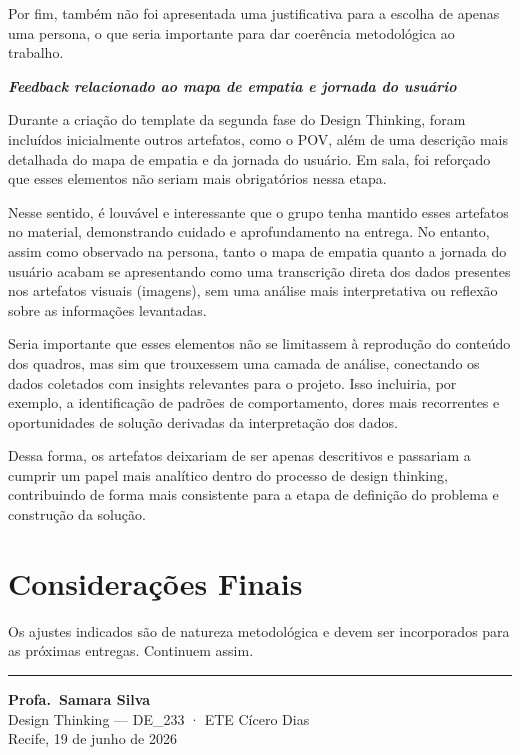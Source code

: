 \documentclass[
  sigconf,
  nonacm, %
  language=portuguese
]{acmart}
\begin{document}
Por fim, também não foi apresentada uma justificativa para a escolha de apenas uma persona, o que seria importante para dar coerência metodológica ao trabalho.

\textit{\textbf{Feedback relacionado ao mapa de empatia e jornada do usuário}}

Durante a criação do template da segunda fase do Design Thinking, foram incluídos inicialmente outros artefatos, como o POV, além de uma descrição mais detalhada do mapa de empatia e da jornada do usuário. Em sala, foi reforçado que esses elementos não seriam mais obrigatórios nessa etapa.

Nesse sentido, é louvável e interessante que o grupo tenha mantido esses artefatos no material, demonstrando cuidado e aprofundamento na entrega. No entanto, assim como observado na persona, tanto o mapa de empatia quanto a jornada do usuário acabam se apresentando como uma transcrição direta dos dados presentes nos artefatos visuais (imagens), sem uma análise mais interpretativa ou reflexão sobre as informações levantadas.

Seria importante que esses elementos não se limitassem à reprodução do conteúdo dos quadros, mas sim que trouxessem uma camada de análise, conectando os dados coletados com insights relevantes para o projeto. Isso incluiria, por exemplo, a identificação de padrões de comportamento, dores mais recorrentes e oportunidades de solução derivadas da interpretação dos dados.

Dessa forma, os artefatos deixariam de ser apenas descritivos e passariam a cumprir um papel mais analítico dentro do processo de design thinking, contribuindo de forma mais consistente para a etapa de definição do problema e construção da solução.

\section{Considerações Finais}

Os ajustes indicados são de natureza metodológica e devem ser
incorporados para as próximas entregas.
Continuem assim.


\vspace{1.5em}
\noindent\rule{\linewidth}{0.4pt}

\begin{flushright}
\textbf{Profa.\ Samara Silva}\\
{\small\color{cmuted} Design Thinking --- DE\_233 · ETE Cícero Dias}\\
{\small\color{cmuted} Recife, 19 de junho de 2026}
\end{flushright}
\end{document}
